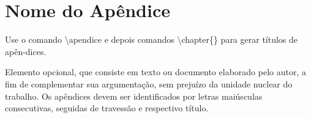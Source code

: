 \apendice
\chapter{Nome do Ap\^endice}
\label{chap:apend}

Use o comando {\ttfamily \textbackslash apendice} e depois comandos {\ttfamily \textbackslash chapter\{\}}
para gerar t\'itulos de ap\^en-dices.

Elemento opcional, que consiste em texto ou documento elaborado pelo autor, a fim de complementar sua argumentação, sem prejuízo da unidade nuclear do trabalho.
Os apêndices devem ser identificados por letras maiúsculas consecutivas, seguidas de travessão e respectivo título.
